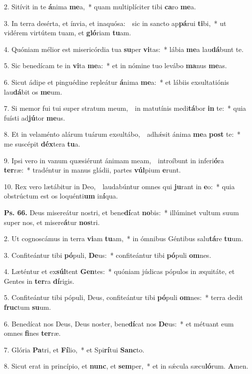 
2. Sitívit in te \textbf{á}nima \textbf{me}a,~* quam multiplíciter tibi \textbf{ca}ro \textbf{me}a.

3. In terra desérta, et ínvia, et inaquósa:~\GreDagger\ sic in sancto ap\textbf{pá}rui \textbf{ti}bi,~* ut vidérem virtútem tuam, et \textbf{gló}riam \textbf{tu}am.

4. Quóniam mélior est misericórdia tua \textbf{su}per \textbf{vi}tas:~* lábia \textbf{me}a lau\textbf{dá}bunt te.

5. Sic benedícam te in \textbf{vi}ta \textbf{me}a:~* et in nómine tuo levábo \textbf{ma}nus \textbf{me}as.

6. Sicut ádipe et pinguédine repleátur \textbf{á}nima \textbf{me}a:~* et lábiis exsultatiónis lau\textbf{dá}bit os \textbf{me}um.

7. Si memor fui tui super stratum meum,~\GreDagger\ in matutínis medi\textbf{tá}bor \textbf{in} te:~* quia fuísti ad\textbf{jú}tor \textbf{me}us.

8. Et in velaménto alárum tuárum exsultábo,~\GreDagger\ adh\'{\ae}sit ánima \textbf{me}a \textbf{post} te:~* me suscépit \textbf{déx}tera \textbf{tu}a.

9. Ipsi vero in vanum quæsiérunt ánimam meam,~\GreDagger\ introíbunt in inferi\textbf{ó}ra \textbf{ter}ræ:~* tradéntur in manus gládii, partes \textbf{vúl}pium \textbf{e}runt.

10. Rex vero lætábitur in Deo,~\GreDagger\ laudabúntur omnes qui \textbf{ju}rant in \textbf{e}o:~* quia obstrúctum est os loquénti\textbf{um} in\textbf{í}qua.

\textbf{Ps. 66.} Deus misereátur nostri, et bene\textbf{dí}cat \textbf{no}bis:~* illúminet vultum suum super nos, et misere\textbf{á}tur \textbf{nos}tri.

2. Ut cognoscámus in terra \textbf{vi}am \textbf{tu}am,~* in ómnibus Géntibus salu\textbf{tá}re \textbf{tu}um.

3. Confiteántur tibi \textbf{pó}puli, \textbf{De}us:~* confiteántur tibi \textbf{pó}puli \textbf{om}nes.

4. Læténtur et ex\textbf{súl}tent \textbf{Gen}tes:~* quóniam júdicas pópulos in æquitáte, et Gentes in \textbf{ter}ra \textbf{dí}rigis.

5. Confiteántur tibi pópuli, Deus, confiteántur tibi \textbf{pó}puli \textbf{om}nes:~* terra dedit \textbf{fruc}tum \textbf{su}um.

6. Benedícat nos Deus, Deus noster, bene\textbf{dí}cat nos \textbf{De}us:~* et métuant eum omnes \textbf{fi}nes \textbf{ter}ræ.

7. Glória \textbf{Pa}tri, et \textbf{Fí}lio,~* et Spi\textbf{rí}tui \textbf{Sanc}to.

8. Sicut erat in princípio, et \textbf{nunc}, et \textbf{sem}per,~* et in s\'{\ae}cula sæcu\textbf{ló}rum. \textbf{A}men.
